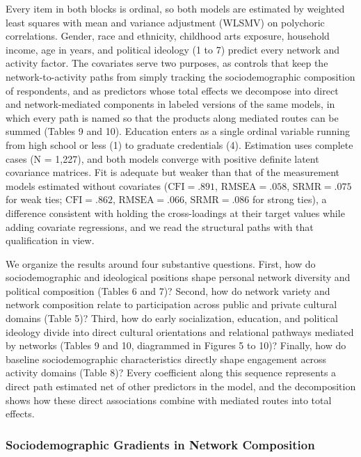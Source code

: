 \documentclass[
  12pt
]{article}
\begin{document}
Every item in both blocks is ordinal, so both models are estimated by weighted least squares with mean and variance adjustment (WLSMV) on polychoric correlations. Gender, race and ethnicity, childhood arts exposure, household income, age in years, and political ideology (1 to 7) predict every network and activity factor. The covariates serve two purposes, as controls that keep the network-to-activity paths from simply tracking the sociodemographic composition of respondents, and as predictors whose total effects we decompose into direct and network-mediated components in labeled versions of the same models, in which every path is named so that the products along mediated routes can be summed (Tables 9 and 10). Education enters as a single ordinal variable running from high school or less (1) to graduate credentials (4). Estimation uses complete cases (N = 1,227), and both models converge with positive definite latent covariance matrices. Fit is adequate but weaker than that of the measurement models estimated without covariates ($\text{CFI} = .891$, $\text{RMSEA} = .058$, $\text{SRMR} = .075$ for weak ties; $\text{CFI} = .862$, $\text{RMSEA} = .066$, $\text{SRMR} = .086$ for strong ties), a difference consistent with holding the cross-loadings at their target values while adding covariate regressions, and we read the structural paths with that qualification in view.

We organize the results around four substantive questions. First, how do sociodemographic and ideological positions shape personal network diversity and political composition (Tables 6 and 7)? Second, how do network variety and network composition relate to participation across public and private cultural domains (Table 5)? Third, how do early socialization, education, and political ideology divide into direct cultural orientations and relational pathways mediated by networks (Tables 9 and 10, diagrammed in Figures 5 to 10)? Finally, how do baseline sociodemographic characteristics directly shape engagement across activity domains (Table 8)? Every coefficient along this sequence represents a direct path estimated net of other predictors in the model, and the decomposition shows how these direct associations combine with mediated routes into total effects.

\subsubsection{Sociodemographic Gradients in Network Composition}\label{sociodemographic-gradients-in-network-composition}
\end{document}
